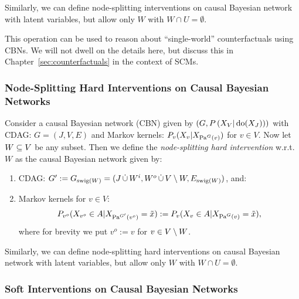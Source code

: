\begin{Rem}
    Similarly, we can define node-splitting interventions on causal Bayesian network with latent variables, 
    but allow only $W$ with $W \cap U = \emptyset$.
\end{Rem}

This operation can be used to reason about ``single-world'' counterfactuals using CBNs.
We will not dwell on the details here, but discuss this in Chapter~\ref{sec:counterfactuals} in the context of SCMs.

\subsubsection{Node-Splitting Hard Interventions on Causal Bayesian Networks}

\begin{Def}
    Consider a causal Bayesian network (CBN) given by $\left ( G, P\left ( X_V|\operatorname{do}(X_J)\right )\right )$ 
    with CDAG: $G=(J,V,E)$ and Markov kernels: $P_v(X_v|X_{\mathrm{Pa}^G(v)})$ for $v \in V$.
    Now let  $ W \subseteq V$ be any subset.
    Then we define the \emph{node-splitting hard intervention} w.r.t.\ $W$ as the causal Bayesian network given by:
    \begin{enumerate}
        \item CDAG: $G':=G_{\mathrm{swig}(W)} = (J \,\dot{\cup}\, W^i, W^o \,\dot{\cup}\, V\setminus W,E_{\mathrm{swig}(W)})$, and:
        \item Markov kernels for $v \in V$:
            \[ P_{v^o}(X_{v^o} \in A| X_{\mathrm{Pa}^{G'}(v^o)}=\tilde x) := P_v(X_v \in A|X_{\mathrm{Pa}^G(v)}=\tilde x), \]
         where for brevity we put $v^o:=v$ for $v \in V \setminus W$.
    \end{enumerate}
\end{Def}

\begin{Rem}
    Similarly, we can define node-splitting hard interventions on causal Bayesian network with latent variables, 
    but allow only $W$ with $W \cap U = \emptyset$.
\end{Rem}


\subsubsection{Soft Interventions on Causal Bayesian Networks}

